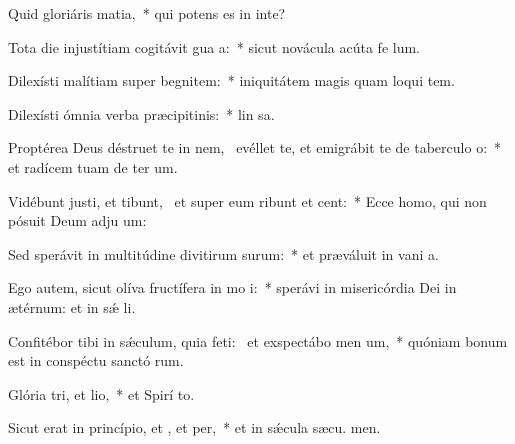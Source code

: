 \item Quid gloriáris  matia,~* qui potens es in inte?
\item Tota die injustítiam cogitávit gua a:~* sicut novácula acúta fe lum.
\item Dilexísti malítiam super begnitem:~* iniquitátem magis quam loqui tem.
\item Dilexísti ómnia verba præcipitinis:~* lin sa.
\item Proptérea Deus déstruet te in nem,~\pscross{} evéllet te, et emigrábit te de taberculo o:~* et radícem tuam de ter um.
\item Vidébunt justi, et tibunt,~\pscross{} et super eum ribunt et cent:~* Ecce homo, qui non pósuit Deum adju um:
\item Sed sperávit in multitúdine divitirum surum:~* et præváluit in vani a.
\item Ego autem, sicut olíva fructífera in mo i:~* sperávi in misericórdia Dei in ætérnum: et in sǽ li.
\item Confitébor tibi in sǽculum, quia feti:~\pscross{} et exspectábo men um,~* quóniam bonum est in conspéctu sanctó rum.
\item Glória tri, et lio,~* et Spirí to.
\item Sicut erat in princípio, et , et per,~* et in sǽcula sæcu. men.
